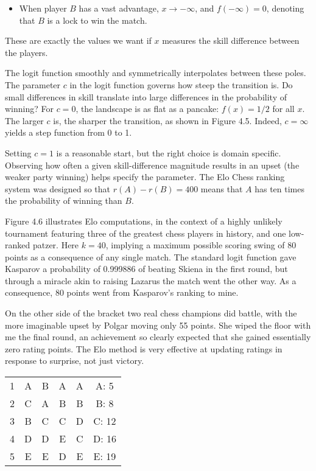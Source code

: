 \documentclass[10pt]{article}
\begin{document}
\begin{itemize}
    \item When player $B$ has a vast advantage, $x \rightarrow -\infty$, and $f(-\infty) = 0$, denoting that $B$ is a lock to win the match.
\end{itemize}

These are exactly the values we want if $x$ measures the skill difference between the players.

The logit function smoothly and symmetrically interpolates between these poles. The parameter $c$ in the logit function governs how steep the transition is. Do small differences in skill translate into large differences in the probability of winning? For $c = 0$, the landscape is as flat as a pancake: $f(x) = 1/2$ for all $x$. The larger $c$ is, the sharper the transition, as shown in Figure 4.5. Indeed, $c = \infty$ yields a step function from 0 to 1.

Setting $c = 1$ is a reasonable start, but the right choice is domain specific. Observing how often a given skill-difference magnitude results in an upset (the weaker party winning) helps specify the parameter. The Elo Chess ranking system was designed so that $r(A) - r(B) = 400$ means that $A$ has ten times the probability of winning than $B$.

Figure 4.6 illustrates Elo computations, in the context of a highly unlikely tournament featuring three of the greatest chess players in history, and one low-ranked patzer. Here $k = 40$, implying a maximum possible scoring swing of 80 points as a consequence of any single match. The standard logit function gave Kasparov a probability of 0.999886 of beating Skiena in the first round, but through a miracle akin to raising Lazarus the match went the other way. As a consequence, 80 points went from Kasparov’s ranking to mine.

On the other side of the bracket two real chess champions did battle, with the more imaginable upset by Polgar moving only 55 points. She wiped the floor with me the final round, an achievement so clearly expected that she gained essentially zero rating points. The Elo method is very effective at updating ratings in response to surprise, not just victory.

\begin{center}
\begin{tabular}{l|ccccc}
1 & A & B & A & A & A: 5 \\
2 & C & A & B & B & B: 8 \\
3 & B & C & C & D & C: 12 \\
4 & D & D & E & C & D: 16 \\
5 & E & E & D & E & E: 19 \\
\end{tabular}
\end{center}
\end{document}
